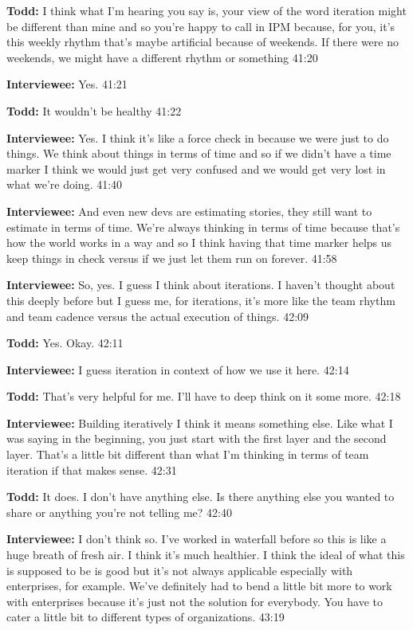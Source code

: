 \textbf{Todd:} I think what I'm hearing you say is, your view of the word iteration might be different than mine and so you're happy to call in IPM because, for you, it's this weekly rhythm that's maybe artificial because of weekends. If there were no weekends, we might have a different rhythm or something 41:20

\textbf{Interviewee:} Yes. 41:21

\textbf{Todd:} It wouldn't be healthy 41:22

\textbf{Interviewee:} Yes. I think it's like a force check in because we were just to do things. We think about things in terms of time and so if we didn't have a time marker I think we would just get very confused and we would get very lost in what we're doing. 41:40

\textbf{Interviewee:} And even new devs are estimating stories, they still want to estimate in terms of time. We're always thinking in terms of time because that's how the world works in a way and so I think having that time marker helps us keep things in check versus if we just let them run on forever. 41:58

\textbf{Interviewee:} So, yes. I guess I think about iterations. I haven't thought about this deeply before but I guess me, for iterations, it's more like the team rhythm and team cadence versus the actual execution of things. 42:09

\textbf{Todd:} Yes. Okay. 42:11

\textbf{Interviewee:} I guess iteration in context of how we use it here. 42:14

\textbf{Todd:} That's very helpful for me. I'll have to deep think on it some more. 42:18

\textbf{Interviewee:} Building iteratively I think it means something else. Like what I was saying in the beginning, you just start with the first layer and the second layer. That's a little bit different than what I'm thinking in terms of team iteration if that makes sense. 42:31

\textbf{Todd:} It does. I don't have anything else. Is there anything else you wanted to share or anything you're not telling me? 42:40

\textbf{Interviewee:} I don't think so. I've worked in waterfall before so this is like a huge breath of fresh air. I think it's much healthier. I think the ideal of what this is supposed to be is good but it's not always applicable especially with enterprises, for example. We've definitely had to bend a little bit more to work with enterprises because it's just not the solution for everybody. You have to cater a little bit to different types of organizations. 43:19

